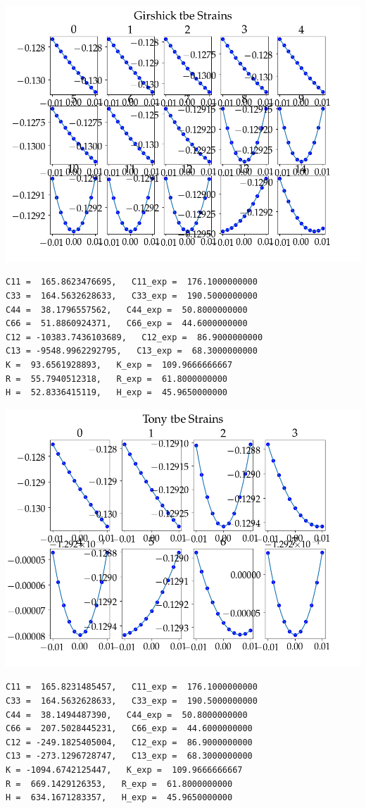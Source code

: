 \documentclass[11pt]{article}
\begin{document}
\begin{enumerate}
\begin{enumerate}
\begin{enumerate}
\begin{center}
\includegraphics[width=.9\linewidth]{Images/girshick_tbe_strains_2018_12_22.png}
\end{center}
\begin{verbatim}
C11 =  165.8623476695,   C11_exp =  176.1000000000
C33 =  164.5632628633,   C33_exp =  190.5000000000
C44 =  38.1796557562,   C44_exp =  50.8000000000
C66 =  51.8860924371,   C66_exp =  44.6000000000
C12 = -10383.7436103689,   C12_exp =  86.9000000000
C13 = -9548.9962292795,   C13_exp =  68.3000000000
K =  93.6561928893,   K_exp =  109.9666666667
R =  55.7940512318,   R_exp =  61.8000000000
H =  52.8336415119,   H_exp =  45.9650000000

\end{verbatim}

\begin{center}
\includegraphics[width=.9\linewidth]{Images/tony_tbe_strains_2018_12_22.png}
\end{center}
\begin{verbatim}
C11 =  165.8231485457,   C11_exp =  176.1000000000
C33 =  164.5632628633,   C33_exp =  190.5000000000
C44 =  38.1494487390,   C44_exp =  50.8000000000
C66 =  207.5028445231,   C66_exp =  44.6000000000
C12 = -249.1825405004,   C12_exp =  86.9000000000
C13 = -273.1296728747,   C13_exp =  68.3000000000
K = -1094.6742125447,   K_exp =  109.9666666667
R =  669.1429126353,   R_exp =  61.8000000000
H =  634.1671283357,   H_exp =  45.9650000000 


\end{verbatim}
\end{enumerate}
\end{enumerate}
\end{enumerate}
\end{document}
